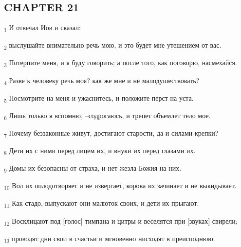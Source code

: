 \subsection{CHAPTER 21}
\begin{tcolorbox}
\textsubscript{1} И отвечал Иов и сказал:
\end{tcolorbox}
\begin{tcolorbox}
\textsubscript{2} выслушайте внимательно речь мою, и это будет мне утешением от вас.
\end{tcolorbox}
\begin{tcolorbox}
\textsubscript{3} Потерпите меня, и я буду говорить; а после того, как поговорю, насмехайся.
\end{tcolorbox}
\begin{tcolorbox}
\textsubscript{4} Разве к человеку речь моя? как же мне и не малодушествовать?
\end{tcolorbox}
\begin{tcolorbox}
\textsubscript{5} Посмотрите на меня и ужаснитесь, и положите перст на уста.
\end{tcolorbox}
\begin{tcolorbox}
\textsubscript{6} Лишь только я вспомню, --содрогаюсь, и трепет объемлет тело мое.
\end{tcolorbox}
\begin{tcolorbox}
\textsubscript{7} Почему беззаконные живут, достигают старости, да и силами крепки?
\end{tcolorbox}
\begin{tcolorbox}
\textsubscript{8} Дети их с ними перед лицем их, и внуки их перед глазами их.
\end{tcolorbox}
\begin{tcolorbox}
\textsubscript{9} Домы их безопасны от страха, и нет жезла Божия на них.
\end{tcolorbox}
\begin{tcolorbox}
\textsubscript{10} Вол их оплодотворяет и не извергает, корова их зачинает и не выкидывает.
\end{tcolorbox}
\begin{tcolorbox}
\textsubscript{11} Как стадо, выпускают они малюток своих, и дети их прыгают.
\end{tcolorbox}
\begin{tcolorbox}
\textsubscript{12} Восклицают под [голос] тимпана и цитры и веселятся при [звуках] свирели;
\end{tcolorbox}
\begin{tcolorbox}
\textsubscript{13} проводят дни свои в счастьи и мгновенно нисходят в преисподнюю.
\end{tcolorbox}
